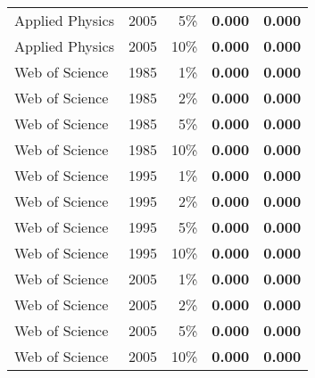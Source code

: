 \documentclass{article}
\begin{document}
\begin{table}
\begin{centering}
{\begin{tabular}{|l crr r|}
Applied Physics & 2005 & 5\% & \textbf{0.000} & \textbf{0.000} \\ 
Applied Physics & 2005 & 10\% & \textbf{0.000} & \textbf{0.000} \\ 
Web of Science & 1985 & 1\% & \textbf{0.000} & \textbf{0.000} \\ 
Web of Science & 1985 & 2\% & \textbf{0.000} & \textbf{0.000} \\ 
Web of Science & 1985 & 5\% & \textbf{0.000} & \textbf{0.000} \\ 
Web of Science & 1985 & 10\% & \textbf{0.000} & \textbf{0.000} \\
Web of Science & 1995 & 1\% & \textbf{0.000} & \textbf{0.000} \\ 
Web of Science & 1995 & 2\% & \textbf{0.000} & \textbf{0.000} \\ 
Web of Science & 1995 & 5\% & \textbf{0.000} & \textbf{0.000} \\ 
Web of Science & 1995 & 10\% & \textbf{0.000} & \textbf{0.000} \\ 
Web of Science & 2005 & 1\% & \textbf{0.000} & \textbf{0.000} \\ 
Web of Science & 2005 & 2\% & \textbf{0.000} & \textbf{0.000} \\ 
Web of Science & 2005 & 5\% & \textbf{0.000} & \textbf{0.000} \\ 
Web of Science & 2005 & 10\% & \textbf{0.000} & \textbf{0.000} \\ 
\hline
\end{tabular}}
\end{centering}
\end{table}
\end{document}
